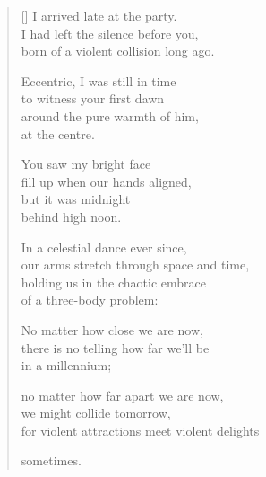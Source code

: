 \documentclass[12pt,a4paper]{article}
\begin{document}
\thispagestyle{empty}


\settowidth{\versewidth}{for violent attractions meet violent delights}

\bigskip

\begin{verse}[\versewidth]
  I arrived late at the party. \\
  I had left the silence before you, \\
  born of a violent collision long ago.

  Eccentric, I was still in time \\
  to witness your first dawn \\
  around the pure warmth of him, \\
  at the centre.

  You saw my bright face \\
  fill up when our hands aligned, \\
  but it was midnight \\
  behind high noon.

  In a celestial dance ever since, \\
  our arms stretch through space and time, \\
  holding us in the chaotic embrace \\
  of a three-body problem:

  No matter how close we are now, \\
  there is no telling how far we'll be \\
  in a millennium;

  no matter how far apart we are now, \\
  we might collide tomorrow, \\
  for violent attractions meet violent delights

  sometimes.
\end{verse}
\end{document}
